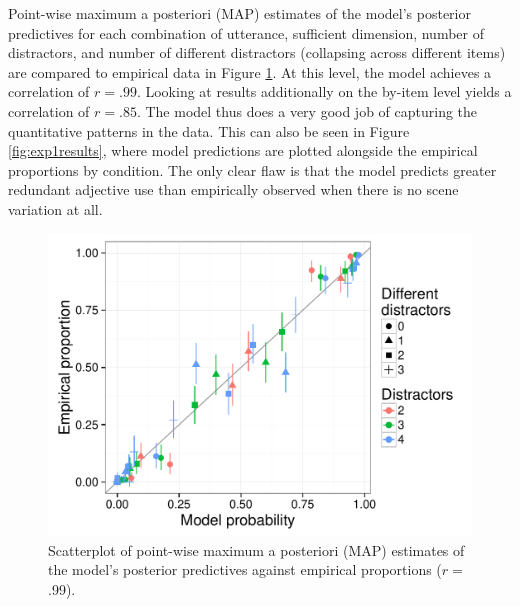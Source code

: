 \documentclass[11pt]{article}
\newcommand{\jd}[1]{\textcolor{Red}{[jd: #1]}}
\newcommand{\figref}[1]{Figure \ref{#1}}
\begin{document}
Point-wise maximum a posteriori (MAP) estimates of the model's posterior predictives for each combination of utterance, sufficient dimension, number of distractors, and number of different distractors (collapsing across different items) are compared to empirical data in \figref{fig:modelexp1scatter}. At this level, the model achieves a correlation of $r = .99$. Looking at results additionally on the by-item level yields a correlation of $r = .85$. The model thus does a very good job of capturing the quantitative patterns in the data. This can also be seen in \figref{fig:exp1results}, where model predictions are plotted alongside the empirical proportions by condition. The only clear flaw is that the model predicts greater redundant adjective use than empirically observed when there is no scene variation at all. %

\begin{figure}
\centering
\includegraphics[width=.8\textwidth]{../../../models/1a_bda_basic/results_bda/graphs/predictives-collapsed-fixed-reducedconditions-unlogged}
\caption{Scatterplot of point-wise maximum a posteriori (MAP) estimates of the model's posterior predictives against empirical proportions ($r=$.99).}
\label{fig:modelexp1scatter}
\end{figure}
\end{document}
